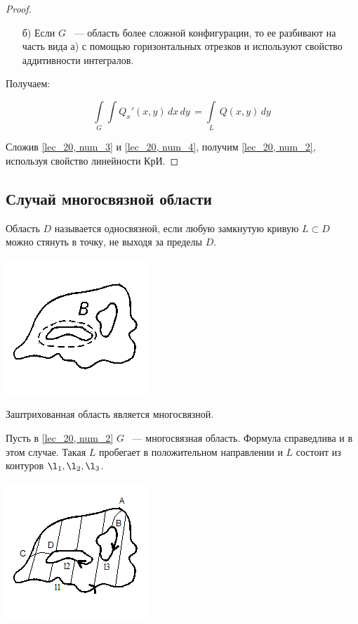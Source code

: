 \documentclass[../../main.tex]{subfiles}
\begin{document}
\begin{proof}
\begin{itemize}
		\item[б)] Если $G$ ~--- область более сложной конфигурации, то ее
		разбивают на часть вида а) с помощью горизонтальных отрезков и
		используют свойство аддитивности интегралов.
	\end{itemize}

Получаем:

\begin{equation}
\label{lec_20, num_4}
\int\limits_{G}\int Q_x' \left(x, y \right)\, dx\, dy\, =
\int\limits_{L}\, Q \left(x, y \right)\, dy\,
\end{equation}

Сложив \eqref{lec_20, num_3} и \eqref{lec_20, num_4}, получим \eqref{lec_20, 
num_2}, используя свойство линейности КрИ.

\end{proof}

\subsection{Случай многосвязной области}

\begin{defn}
	Область $D$ называется односвязной, если любую замкнутую кривую $L \subset D$ 
	можно стянуть в точку, не выходя за пределы $D$.
\end{defn}

\begin{center}
	\includegraphics[scale = 1.5]{lec20_6.png}
\end{center}

Заштрихованная область является многосвязной.

Пусть в \eqref{lec_20, num_2} $G$ ~--- многосвязная область. Формула 
справедлива
и в этом случае. Такая $L$ пробегает в положительном направлении и
$L$ состоит из контуров $\l_1, \l_2, \l_3$.

\begin{center}
	\includegraphics[scale = 1.5]{lec20_7.png}
\end{center}
\end{document}
